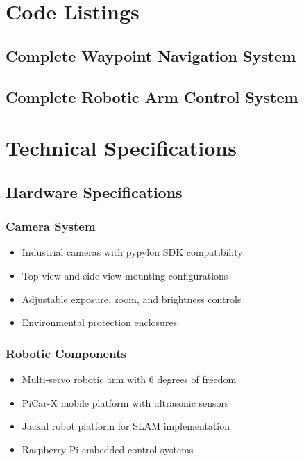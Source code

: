 \documentclass{book}
\begin{document}
\begin{appendices}
\chapter{Code Listings}

\section{Complete Waypoint Navigation System}


\section{Complete Robotic Arm Control System}


\chapter{Technical Specifications}

\section{Hardware Specifications}

\subsection{Camera System}
\begin{itemize}
\item Industrial cameras with pypylon SDK compatibility
\item Top-view and side-view mounting configurations
\item Adjustable exposure, zoom, and brightness controls
\item Environmental protection enclosures
\end{itemize}

\subsection{Robotic Components}
\begin{itemize}
\item Multi-servo robotic arm with 6 degrees of freedom
\item PiCar-X mobile platform with ultrasonic sensors
\item Jackal robot platform for SLAM implementation
\item Raspberry Pi embedded control systems
\end{itemize}


\end{appendices}
\end{document}
